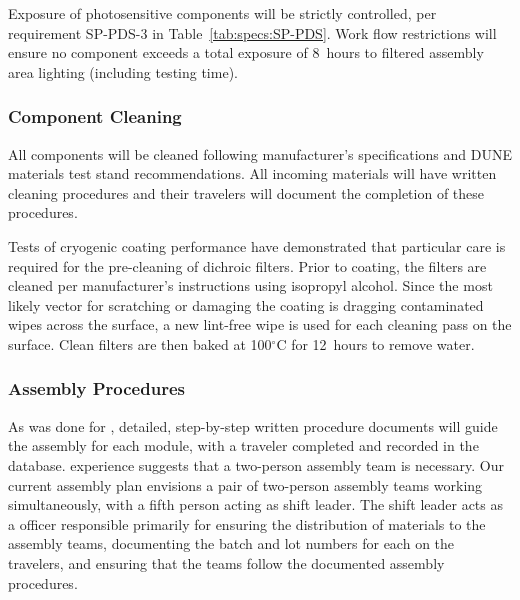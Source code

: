 Exposure of photosensitive components will be strictly controlled, per requirement SP-PDS-3 in Table~\ref{tab:specs:SP-PDS}.  Work flow restrictions will %
ensure no component exceeds a total exposure of \SI{8}{hours} to filtered assembly area lighting (including testing time).

\subsubsection{Component Cleaning}

All components will be cleaned %
following manufacturer's specifications and DUNE materials test stand recommendations.  %
All incoming materials will have written cleaning procedures and their travelers will document the completion of these procedures.

Tests of cryogenic coating performance have demonstrated that particular care is required for the pre-cleaning of dichroic filters.  Prior to coating, the filters are cleaned per manufacturer's instructions %
using isopropyl alcohol. Since the most likely vector for scratching or damaging the coating is dragging contaminated wipes across the surface, a new %
lint-free wipe is used for each  cleaning pass on the surface. Clean filters are then baked at 100$^\circ$C for \SI{12}{hours} to remove water. 

\subsubsection{Assembly Procedures}

As was done for , detailed, step-by-step written procedure documents will %
guide the assembly for each  module, with a  traveler%
completed and recorded in the database.   experience suggests that a two-person assembly team is necessary. %
Our current assembly plan envisions a pair of two-person assembly teams working simultaneously, %
with a fifth person acting as shift leader.  The shift leader %
acts as a  officer responsible primarily for ensuring the distribution of materials to the assembly teams, documenting the batch and lot numbers for each  on the %
travelers, and ensuring that the teams follow the documented assembly procedures. %

